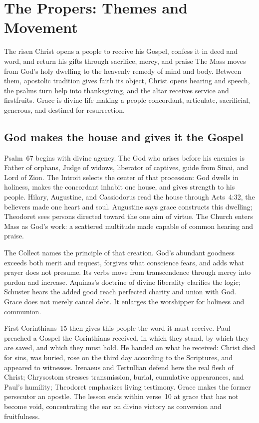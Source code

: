 \section*{The Propers: Themes and Movement}
\label{triptych:brief-synthesis:start}

\begingroup\footnotesize
\setlength{\parskip}{0.28em}

\begin{massbox}{The risen Christ opens a people to receive his Gospel, confess it in deed and word, and return his gifts through sacrifice, mercy, and praise}
The Mass moves from God's holy dwelling to the heavenly remedy of mind and
body. Between them, apostolic tradition gives faith its object, Christ opens
hearing and speech, the psalms turn help into thanksgiving, and the altar
receives service and firstfruits. Grace is divine life making a people
concordant, articulate, sacrificial, generous, and destined for resurrection.
\end{massbox}

\subsection*{God makes the house and gives it the Gospel}

Psalm~67 begins with divine agency. The God who arises before his enemies is
Father of orphans, Judge of widows, liberator of captives, guide from Sinai,
and Lord of Zion. The Introit selects the center of that procession: God dwells
in holiness, makes the concordant inhabit one house, and gives strength to his
people. Hilary, Augustine, and Cassiodorus read the house through Acts~4:32,
the believers made one heart and soul. Augustine says grace constructs this
dwelling; Theodoret sees persons directed toward the one aim of virtue. The
Church enters Mass as God's work: a scattered multitude made capable of common
hearing and praise.

The Collect names the principle of that creation. God's abundant goodness
exceeds both merit and request, forgives what conscience fears, and adds what
prayer does not presume. Its verbs move from transcendence through mercy into
pardon and increase. Aquinas's doctrine of divine liberality clarifies the
logic; Schuster hears the added good reach perfected charity and union with
God. Grace does not merely cancel debt. It enlarges the worshipper for holiness
and communion.

First Corinthians~15 then gives this people the word it must receive. Paul
preached a Gospel the Corinthians received, in which they stand, by which they
are saved, and which they must hold. He handed on what he received: Christ died
for sins, was buried, rose on the third day according to the Scriptures, and
appeared to witnesses. Irenaeus and Tertullian defend here the real flesh of
Christ; Chrysostom stresses transmission, burial, cumulative appearances, and
Paul's humility; Theodoret emphasizes living testimony. Grace makes the former
persecutor an apostle. The lesson ends within verse~10 at grace that has not
become void, concentrating the ear on divine victory as conversion and
fruitfulness.

